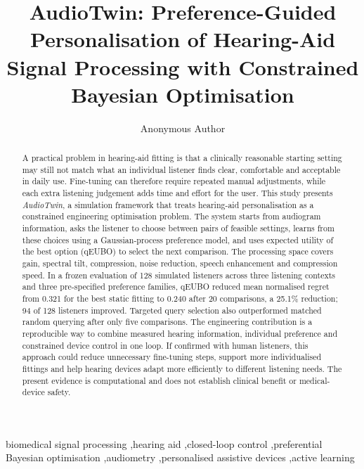 \documentclass[preprint,12pt]{elsarticle}
\begin{document}
\begin{frontmatter}

\title{AudioTwin: Preference-Guided Personalisation of Hearing-Aid Signal Processing with Constrained Bayesian Optimisation}

\author[anon]{Anonymous Author}
\address[anon]{Anonymous Institution}

\begin{abstract}
A practical problem in hearing-aid fitting is that a clinically reasonable starting setting may still not match what an individual listener finds clear, comfortable and acceptable in daily use. Fine-tuning can therefore require repeated manual adjustments, while each extra listening judgement adds time and effort for the user. This study presents \textit{AudioTwin}, a simulation framework that treats hearing-aid personalisation as a constrained engineering optimisation problem. The system starts from audiogram information, asks the listener to choose between pairs of feasible settings, learns from these choices using a Gaussian-process preference model, and uses expected utility of the best option (qEUBO) to select the next comparison. The processing space covers gain, spectral tilt, compression, noise reduction, speech enhancement and compression speed. In a frozen evaluation of 128 simulated listeners across three listening contexts and three pre-specified preference families, qEUBO reduced mean normalised regret from 0.321 for the best static fitting to 0.240 after 20 comparisons, a 25.1\% reduction; 94 of 128 listeners improved. Targeted query selection also outperformed matched random querying after only five comparisons. The engineering contribution is a reproducible way to combine measured hearing information, individual preference and constrained device control in one loop. If confirmed with human listeners, this approach could reduce unnecessary fine-tuning steps, support more individualised fittings and help hearing devices adapt more efficiently to different listening needs. The present evidence is computational and does not establish clinical benefit or medical-device safety.
\end{abstract}

\begin{keyword}
biomedical signal processing \sep hearing aid \sep closed-loop control \sep preferential Bayesian optimisation \sep audiometry \sep personalised assistive devices \sep active learning
\end{keyword}

\end{frontmatter}
\end{document}
